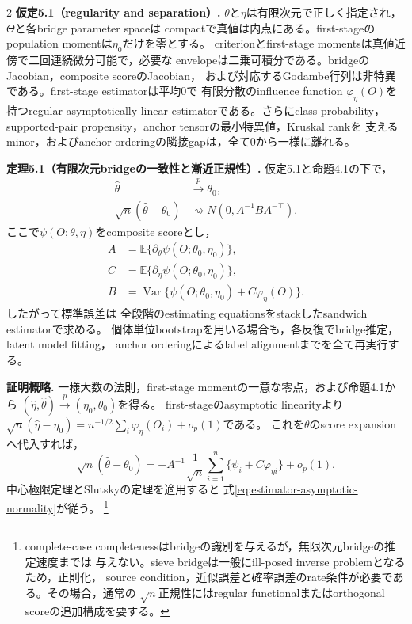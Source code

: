 \documentclass[a4paper,10pt]{article}
\newcommand{\E}{\mathbb E}
\begin{document}
\begin{multicols}{2}
\noindent\textbf{仮定5.1（regularity and separation）.}
$\theta$と$\eta$は有限次元で正しく指定され，$\Theta$と各bridge parameter spaceは
compactで真値は内点にある。first-stageのpopulation momentは$\eta_0$だけを零とする。
criterionとfirst-stage momentsは真値近傍で二回連続微分可能で，必要な
envelopeは二乗可積分である。bridgeのJacobian，composite scoreのJacobian，
および対応するGodambe行列は非特異である。first-stage estimatorは平均0で
有限分散のinfluence function $\varphi_\eta(O)$を持つregular asymptotically linear
estimatorである。さらにclass probability，
supported-pair propensity，anchor tensorの最小特異値，Kruskal rankを
支えるminor，およびanchor orderingの隣接gapは，全て0から一様に離れる。

\noindent\textbf{定理5.1（有限次元bridgeの一致性と漸近正規性）.}
仮定5.1と命題4.1の下で，
\begin{subequations}\label{eq:estimator-asymptotics}
\begin{align}
\widehat\theta&\xrightarrow{p}\theta_0,
\label{eq:estimator-consistency}\\
\sqrt n(\widehat\theta-\theta_0)
&\rightsquigarrow N(0,A^{-1}BA^{-\top}).
\label{eq:estimator-asymptotic-normality}
\end{align}
\end{subequations}
ここで$\psi(O;\theta,\eta)$をcomposite scoreとし，
\begin{equation}
\begin{aligned}
A&=\E\{\partial_\theta\psi(O;\theta_0,\eta_0)\},\\
C&=\E\{\partial_\eta\psi(O;\theta_0,\eta_0)\},\\
B&=\operatorname{Var}\{\psi(O;\theta_0,\eta_0)
      +C\varphi_\eta(O)\}.
\end{aligned}
\label{eq:stacked-sandwich-components}
\end{equation}
したがって標準誤差は
全段階のestimating equationsをstackしたsandwich estimatorで求める。
個体単位bootstrapを用いる場合も，各反復でbridge推定，latent model fitting，
anchor orderingによるlabel alignmentまでを全て再実行する。

\noindent\textbf{証明概略.}
一様大数の法則，first-stage momentの一意な零点，および命題4.1から
$(\widehat\eta,\widehat\theta)\xrightarrow{p}(\eta_0,\theta_0)$を得る。
first-stageのasymptotic linearityより
$\sqrt n(\widehat\eta-\eta_0)=n^{-1/2}\sum_i\varphi_\eta(O_i)+o_p(1)$である。
これを$\theta$のscore expansionへ代入すれば，
\begin{equation}
\sqrt n(\widehat\theta-\theta_0)
=-A^{-1}\frac1{\sqrt n}\sum_{i=1}^n
\{\psi_i+C\varphi_{\eta i}\}+o_p(1).
\label{eq:stacked-score-expansion}
\end{equation}
中心極限定理とSlutskyの定理を適用すると
式\eqref{eq:estimator-asymptotic-normality}が従う。%
\footnote{complete-case completenessはbridgeの識別を与えるが，無限次元bridgeの推定速度までは
与えない。sieve bridgeは一般にill-posed inverse problemとなるため，正則化，
source condition，近似誤差と確率誤差のrate条件が必要である。その場合，通常の
$\sqrt n$正規性にはregular functionalまたはorthogonal scoreの追加構成を要する。}


\end{multicols}
\end{document}
